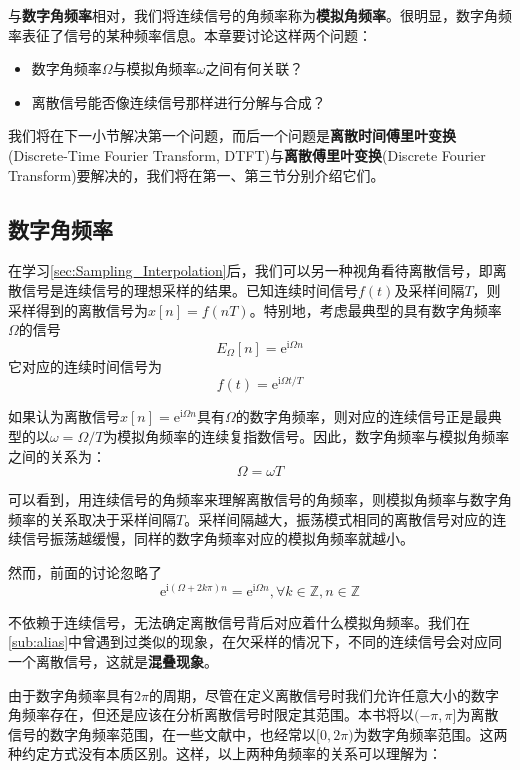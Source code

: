 \documentclass{ctexbook}
\begin{document}
与\textbf{数字角频率}相对，我们将连续信号的角频率称为\textbf{模拟角频率}。很明显，数字角频率表征了信号的某种频率信息。本章要讨论这样两个问题：\begin{itemize}
    \item 数字角频率$\Omega$与模拟角频率$\omega$之间有何关联？
    \item 离散信号能否像连续信号那样进行分解与合成？
\end{itemize}

我们将在下一小节解决第一个问题，而后一个问题是\textbf{离散时间傅里叶变换}(Discrete-Time Fourier Transform, DTFT)与\textbf{离散傅里叶变换}(Discrete Fourier Transform)要解决的，我们将在第一、第三节分别介绍它们。

\subsection{数字角频率}\label{sub:digital_freq}

在学习\ref{sec:Sampling_Interpolation}后，我们可以另一种视角看待离散信号，即离散信号是连续信号的理想采样的结果。已知连续时间信号$f(t)$及采样间隔$T$，则采样得到的离散信号为$x[n]=f(nT)$。特别地，考虑最典型的具有数字角频率$\Omega$的信号
$$E_{\Omega}[n]=\mathrm{e}^{\mathrm{i}\Omega n}$$
它对应的连续时间信号为
\[f(t)=\mathrm{e}^{\mathrm{i}\Omega t/T}\]

如果认为离散信号$x[n]=\mathrm{e}^{\mathrm{i}\Omega n}$具有$\Omega$的数字角频率，则对应的连续信号正是最典型的以$\omega=\Omega/T$为模拟角频率的连续复指数信号。因此，数字角频率与模拟角频率之间的关系为：
\[\Omega=\omega T\]

可以看到，用连续信号的角频率来理解离散信号的角频率，则模拟角频率与数字角频率的关系取决于采样间隔$T$。采样间隔越大，振荡模式相同的离散信号对应的连续信号振荡越缓慢，同样的数字角频率对应的模拟角频率就越小。

然而，前面的讨论忽略了
$$\mathrm{e}^{\mathrm{i}(\Omega+2k\pi)n}=\mathrm{e}^{\mathrm{i}\Omega n},\forall k\in\mathbb{Z},n\in\mathbb{Z}$$

不依赖于连续信号，无法确定离散信号背后对应着什么模拟角频率。我们在\ref{sub:alias}中曾遇到过类似的现象，在欠采样的情况下，不同的连续信号会对应同一个离散信号，这就是\textbf{混叠现象}。

由于数字角频率具有$2\pi$的周期，尽管在定义离散信号时我们允许任意大小的数字角频率存在，但还是应该在分析离散信号时限定其范围。本书将以$(-\pi,\pi]$为离散信号的数字角频率范围\cite{signal_systems}，在一些文献中，也经常以$[0,2\pi)$为数字角频率范围。这两种约定方式没有本质区别。这样，以上两种角频率的关系可以理解为：
\end{document}
